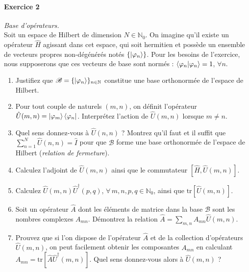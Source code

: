 \paragraph{Exercice 2} \textit{Base d'opérateurs.} \\
Soit un espace de Hilbert de dimension $N\in\mathbb N_0$. On imagine qu'il existe un opérateur $\hat H$ agissant dans cet espace, qui soit hermitien et possède un ensemble de vecteurs propres non-dégénérés notés $\lbrace\ket{\varphi_n}\rbrace$. Pour les besoins de l'exercice, nous supposerons que ces vecteurs de base sont normés : $\braket{\varphi_n}{\varphi_n} = 1$, $\forall n$. 
\begin{enumerate}
	\item Justifiez que $\mathscr B = \lbrace\ket{\varphi_n}\rbrace_{n\in\mathbb{N}}$ constitue une base orthonormée de l'espace de Hilbert. 
	\item Pour tout couple de naturels $(m,n)$, on définit l'opérateur $\hat U(m,n) = \ket{\varphi_m}\bra{\varphi_n}$. Interprétez l'action de $\hat U(m,n)$ lorsque $m\neq n$.
	\item Quel sens donnez-vous à $\hat U(n,n)$ ? Montrez qu'il faut et il suffit que $\sum_{n=1}^N \hat U(n,n) = \hat I$ pour que $\mathscr B$ forme une base orthonormée de l'espace de Hilbert (\textit{relation de fermeture}).
	\item Calculez l'adjoint de $\hat U(m,n)$ ainsi que le commutateur $[\hat H,\hat U(m,n)]$.
	\item Calculez $\hat U(m,n) \hat U^\dagger (p,q)$, $\forall\, m,n,p,q \in \mathbb{N}_0$, ainsi que $\text{tr} [\hat U(m,n)]$. 
	\item Soit un opérateur $\hat A$ dont les éléments de matrice dans la base $\mathscr B$ sont les nombres complexes $A_{mn}$. Démontrez la relation $\hat A = \sum_{m,n} A_{mn} \hat U(m,n)$.
	\item Prouvez que si l'on dispose de l'opérateur $\hat A$ et de la collection d'opérateurs $\hat U(m,n)$, on peut facilement obtenir les composantes $A_{mn}$ en calculant $A_{mn} = \text{tr} [\hat A \hat U^\dagger (m,n)]$. Quel sens donnez-vous alors à $\hat U(m,n)$ ?
\end{enumerate}
	
